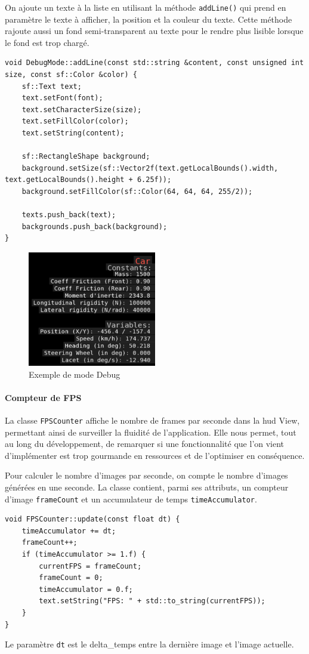 On ajoute un texte à la liste en utilisant la méthode \texttt{addLine()} qui prend en paramètre le texte à afficher, la position et la couleur du texte.
Cette méthode rajoute aussi un fond semi-transparent au texte pour le rendre plus lisible lorsque le fond est trop chargé.

\begin{lstlisting}[style=CStyle, label={lst:code_addline}]
void DebugMode::addLine(const std::string &content, const unsigned int size, const sf::Color &color) {
    sf::Text text;
    text.setFont(font);
    text.setCharacterSize(size);
    text.setFillColor(color);
    text.setString(content);

    sf::RectangleShape background;
    background.setSize(sf::Vector2f(text.getLocalBounds().width, text.getLocalBounds().height + 6.25f));
    background.setFillColor(sf::Color(64, 64, 64, 255/2));

    texts.push_back(text);
    backgrounds.push_back(background);
}
\end{lstlisting}
\begin{figure}[H]
    \centering
    \includegraphics[width=0.5\textwidth]{resources/example_debug_mode_1}
    \caption{Exemple de mode Debug}
    \label{fig:debug_mode}
\end{figure}

\paragraph{Compteur de FPS}
La classe \texttt{FPSCounter} affiche le nombre de frames par seconde dans la \gls{hud} View, permettant ainsi de surveiller la fluidité de l'application.
Elle nous permet, tout au long du développement, de remarquer si une fonctionnalité que l'on vient d'implémenter est trop gourmande en ressources et de l'optimiser en conséquence.

Pour calculer le nombre d'images par seconde, on compte le nombre d'images générées en une seconde.
La classe contient, parmi ses attributs, un compteur d'image \texttt{frameCount} et un accumulateur de temps \texttt{timeAccumulator}.
\begin{lstlisting}[style=CStyle, label={lst:code_fpscounter}]
void FPSCounter::update(const float dt) {
    timeAccumulator += dt;
    frameCount++;
    if (timeAccumulator >= 1.f) {
        currentFPS = frameCount;
        frameCount = 0;
        timeAccumulator = 0.f;
        text.setString("FPS: " + std::to_string(currentFPS));
    }
}
\end{lstlisting}
Le paramètre \texttt{dt} est le \gls{delta_temps} entre la dernière image et l'image actuelle.


